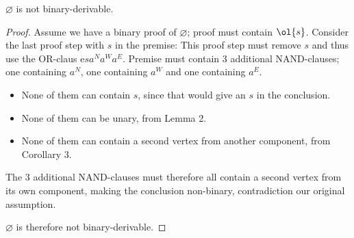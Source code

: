 \begin{theorem}
  $\varnothing$ is not binary-derivable.
  \label{thm:non_binary_derivable_paradox}
\end{theorem}
\begin{proof}
  Assume we have a binary proof of $\varnothing$;
  proof must contain $\ol{s}$.
  Consider the last proof step with $s$ in the premise:
  This proof step must remove $s$ and thus use the OR-claus e$sa^Na^Wa^E$.
  Premise must contain 3 additional NAND-clauses;
  one containing $a^N$, one containing $a^W$ and one containing $a^E$.
  \begin{itemize}
    \item None of them can contain $s$, since that would give an $s$ in the conclusion.
    \item None of them can be unary, from Lemma 2.
    \item None of them can contain a second vertex from another component, from Corollary 3.
  \end{itemize}
  The 3 additional NAND-clauses must therefore all contain a second vertex from its own component,
  making the conclusion non-binary, contradiction our original assumption.

  $\varnothing$ is therefore not binary-derivable.
\end{proof}
